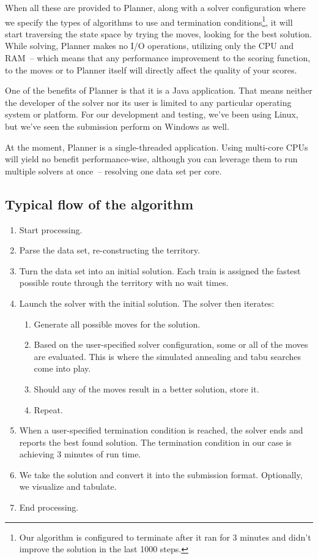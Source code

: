 \documentclass[10pt,a4paper,final]{article}
\begin{document}
When all these are provided to Planner, along with a solver configuration where we specify  the types of algorithms to use and termination conditions\footnote{Our algorithm is configured to terminate after it ran for 3 minutes and didn't improve the solution in the last 1000 steps.}, it will start traversing the state space by trying the moves, looking for the best solution. While solving, Planner makes no I/O operations, utilizing only the CPU and RAM~-- which means that any performance improvement to the scoring function, to the moves or to Planner itself will directly affect the quality of your scores. 

One of the benefits of Planner is that it is a Java application. That means neither the developer of the solver nor its user is limited to any particular operating system or platform. For our development and testing, we've been using Linux, but we've seen the submission perform on Windows as well.

At the moment, Planner is a single-threaded application. Using multi-core CPUs will yield no benefit performance-wise, although you can leverage them to run multiple solvers at once~-- resolving one data set per core.

\subsection{Typical flow of the algorithm}

\begin{enumerate}
\item Start processing.
\item Parse the data set, re-constructing the territory.
\item Turn the data set into an initial solution. Each train is assigned the fastest possible route through the territory with no wait times. 
\item Launch the solver with the initial solution. The solver then iterates:

\begin{enumerate}
\item Generate all possible moves for the solution.
\item Based on the user-specified solver configuration, some or all of the moves are evaluated. This is where the simulated annealing and tabu searches come into play.
\item Should any of the moves result in a better solution, store it.
\item Repeat.
\end{enumerate}

\item When a user-specified termination condition is reached, the solver ends and reports the best found solution. The termination condition in our case is achieving 3 minutes of run time.
\item We take the solution and convert it into the submission format. Optionally, we visualize and tabulate.
\item End processing.
\end{enumerate}
\end{document}
